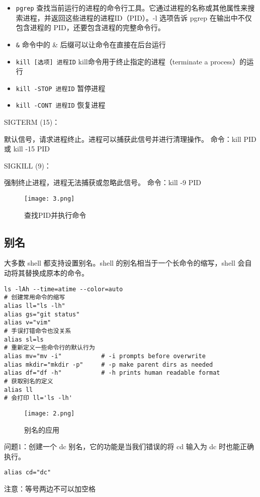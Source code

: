 \documentclass[a4paper, 12pt]{article}
\begin{document}
\begin{itemize}
  \item \texttt{pgrep}    查找当前运行的进程的命令行工具。它通过进程的名称或其他属性来搜索进程，并返回这些进程的进程ID（PID）。-l 选项告诉 pgrep 在输出中不仅包含进程的 PID，还要包含进程的完整命令行。
   \item \texttt{\&}    命令中的 \& 后缀可以让命令在直接在后台运行
  \item \texttt{kill [选项] 进程ID}    kill命令用于终止指定的进程（terminate a process）的运行
  \item \texttt{kill -STOP 进程ID}    暂停进程
 \item \texttt{kill -CONT 进程ID}    恢复进程
  \end{itemize}

SIGTERM (15)：

默认信号，请求进程终止。进程可以捕获此信号并进行清理操作。
命令：kill PID 或 kill -15 PID

SIGKILL (9)：

强制终止进程，进程无法捕获或忽略此信号。
命令：kill -9 PID
  
\begin{figure}[H]
  \centering
    \texttt{[image: 3.png]}
  \caption{查找PID并执行命令}
   \end{figure}

\subsection{别名}  

大多数 shell 都支持设置别名。shell 的别名相当于一个长命令的缩写，shell 会自动将其替换成原本的命令。

\begin{lstlisting}
ls -lAh --time=atime --color=auto
# 创建常用命令的缩写
alias ll="ls -lh"
alias gs="git status"
alias v="vim"
# 手误打错命令也没关系
alias sl=ls
# 重新定义一些命令行的默认行为
alias mv="mv -i"           # -i prompts before overwrite
alias mkdir="mkdir -p"     # -p make parent dirs as needed
alias df="df -h"           # -h prints human readable format
# 获取别名的定义
alias ll
# 会打印 ll='ls -lh'
\end{lstlisting}

\begin{figure}[H]
  \centering
    \texttt{[image: 2.png]}
  \caption{别名的应用}
   \end{figure}

问题1：创建一个 dc 别名，它的功能是当我们错误的将 cd 输入为 dc 时也能正确执行。
\begin{lstlisting}
alias cd="dc"
\end{lstlisting}
注意：等号两边不可以加空格
\end{document}

